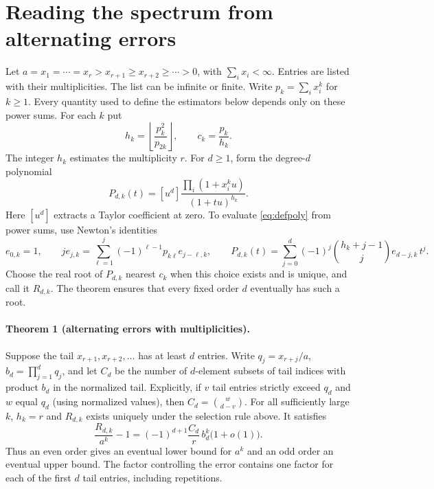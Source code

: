 \documentclass[11pt]{article}
\begin{document}
\section{Reading the spectrum from alternating errors}
\label{sec:deflation}

Let $a=x_1=\cdots=x_r>x_{r+1}\ge x_{r+2}\ge\cdots>0$,
with $\sum_i x_i<\infty$. Entries are listed with their multiplicities.
The list can be infinite or finite. Write $p_k=\sum_i x_i^k$ for $k\ge1$.
Every quantity used to define the estimators below depends only on these power sums.
For each $k$ put
\[
    h_k=\left\lfloor\frac{p_k^2}{p_{2k}}\right\rfloor,
    \qquad c_k=\frac{p_k}{h_k}.
\]
The integer $h_k$ estimates the multiplicity $r$. For $d\ge1$, form the degree-$d$
polynomial
\begin{equation}\label{eq:defpoly}
 P_{d,k}(t)=[u^d]\frac{\prod_i(1+x_i^k u)}{(1+tu)^{h_k}} .
\end{equation}
Here $[u^d]$ extracts a Taylor coefficient at zero. To evaluate
\eqref{eq:defpoly} from power sums, use Newton's identities
\[
 e_{0,k}=1,\qquad
 j e_{j,k}=\sum_{\ell=1}^j(-1)^{\ell-1}p_{k\ell}e_{j-\ell,k},\qquad
 P_{d,k}(t)=\sum_{j=0}^d(-1)^j{h_k+j-1\choose j}e_{d-j,k}\,t^j.
\]
Choose the real root of $P_{d,k}$ nearest $c_k$ when this choice exists and
is unique, and call it $R_{d,k}$. The theorem ensures that every fixed order
$d$ eventually has such a root.

\paragraph{Theorem 1 (alternating errors with multiplicities).}
Suppose the tail $x_{r+1},x_{r+2},\ldots$ has at least $d$ entries. Write
$q_j=x_{r+j}/a$, $b_d=\prod_{j=1}^d q_j$, and let $C_d$ be the number of
$d$-element subsets of tail indices with product $b_d$ in the normalized
tail. Explicitly, if $v$ tail entries strictly exceed $q_d$ and $w$ equal
$q_d$ (using normalized values), then $C_d={w\choose d-v}$.
For all sufficiently large $k$, $h_k=r$ and $R_{d,k}$ exists uniquely
under the selection rule above. It satisfies
\begin{equation}\label{eq:defasym}
 \frac{R_{d,k}}{a^k}-1
    =(-1)^{d+1}\frac{C_d}{r}\,b_d^k\bigl(1+o(1)\bigr).
\end{equation}
Thus an even order gives an eventual lower bound for $a^k$ and an odd order an
eventual upper bound. The factor controlling the error contains one factor for
each of the first $d$ tail entries, including repetitions.
\end{document}
